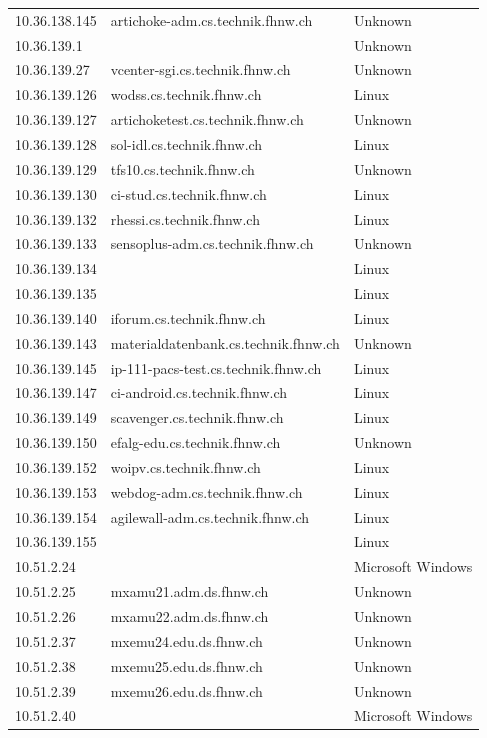 \documentclass[11pt,a4paper]{scrartcl}
\begin{document}
\begin{longtable}{p{2.5cm}|p{8cm}|l}
	10.36.138.145 & artichoke-adm.cs.technik.fhnw.ch & Unknown\\
	10.36.139.1 &  & Unknown\\
	10.36.139.27 & vcenter-sgi.cs.technik.fhnw.ch & Unknown\\
	10.36.139.126 & wodss.cs.technik.fhnw.ch & Linux\\
	10.36.139.127 & artichoketest.cs.technik.fhnw.ch & Unknown\\
	10.36.139.128 & sol-idl.cs.technik.fhnw.ch & Linux\\
	10.36.139.129 & tfs10.cs.technik.fhnw.ch & Unknown\\
	10.36.139.130 & ci-stud.cs.technik.fhnw.ch & Linux\\
	10.36.139.132 & rhessi.cs.technik.fhnw.ch & Linux\\
	10.36.139.133 & sensoplus-adm.cs.technik.fhnw.ch & Unknown\\
	10.36.139.134 &  & Linux\\
	10.36.139.135 &  & Linux\\
	10.36.139.140 & iforum.cs.technik.fhnw.ch & Linux\\
	10.36.139.143 & materialdatenbank.cs.technik.fhnw.ch & Unknown\\
	10.36.139.145 & ip-111-pacs-test.cs.technik.fhnw.ch & Linux\\
	10.36.139.147 & ci-android.cs.technik.fhnw.ch & Linux\\
	10.36.139.149 & scavenger.cs.technik.fhnw.ch & Linux\\
	10.36.139.150 & efalg-edu.cs.technik.fhnw.ch & Unknown\\
	10.36.139.152 & woipv.cs.technik.fhnw.ch & Linux\\
	10.36.139.153 & webdog-adm.cs.technik.fhnw.ch & Linux\\
	10.36.139.154 & agilewall-adm.cs.technik.fhnw.ch & Linux\\
	10.36.139.155 &  & Linux\\
	10.51.2.24 &  & Microsoft Windows\\
	10.51.2.25 & mxamu21.adm.ds.fhnw.ch & Unknown\\
	10.51.2.26 & mxamu22.adm.ds.fhnw.ch & Unknown\\
	10.51.2.37 & mxemu24.edu.ds.fhnw.ch & Unknown\\
	10.51.2.38 & mxemu25.edu.ds.fhnw.ch & Unknown\\
	10.51.2.39 & mxemu26.edu.ds.fhnw.ch & Unknown\\
	10.51.2.40 &  & Microsoft Windows\\

\end{longtable}
\end{document}
